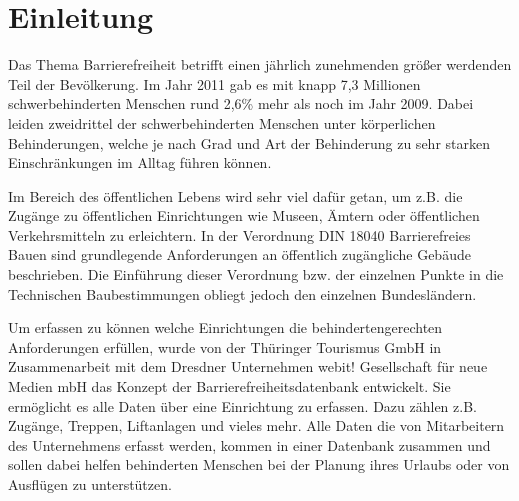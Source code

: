 %
\chapter{Einleitung}
\label{sec:Einleitung}





Das Thema Barrierefreiheit betrifft einen jährlich zunehmenden größer werdenden Teil der Bevölkerung. Im Jahr 2011 gab es mit knapp 7,3 Millionen schwerbehinderten Menschen rund 2,6\% mehr als noch im Jahr 2009.\cite[]{WEB:DESTATIS:2014} Dabei leiden zweidrittel der schwerbehinderten Menschen unter körperlichen Behinderungen, welche je nach Grad und Art der Behinderung zu sehr starken Einschränkungen im Alltag führen können.

Im Bereich des öffentlichen Lebens wird sehr viel dafür getan, um z.B. die Zugänge zu öffentlichen Einrichtungen wie Museen, Ämtern oder öffentlichen Verkehrsmitteln zu erleichtern. In der Verordnung DIN 18040 Barrierefreies Bauen sind grundlegende Anforderungen an öffentlich zugängliche Gebäude beschrieben. Die Einführung dieser Verordnung bzw. der einzelnen Punkte in die Technischen Baubestimmungen obliegt jedoch den einzelnen Bundesländern.\cite[]{WEB:DIN18040:2010}

Um erfassen zu können welche Einrichtungen die behindertengerechten Anforderungen erfüllen, wurde von der Thüringer Tourismus GmbH in Zusammenarbeit mit dem Dresdner Unternehmen webit! Gesellschaft für neue Medien mbH das Konzept der Barrierefreiheitsdatenbank entwickelt. Sie ermöglicht es alle Daten über eine Einrichtung zu erfassen. Dazu zählen z.B. Zugänge, Treppen, Liftanlagen und vieles mehr. Alle Daten die von Mitarbeitern des Unternehmens erfasst werden, kommen in einer Datenbank zusammen und sollen dabei helfen behinderten Menschen bei der Planung ihres Urlaubs oder von Ausflügen zu unterstützen.


